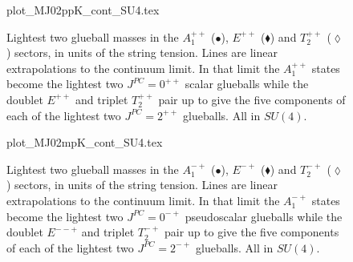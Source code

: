 \documentclass[12pt]{article}
\begin{document}




\begin{figure}[htb]
\begin	{center}
\leavevmode
	{plot_MJ02ppK_cont_SU4.tex}
\end	{center}
\caption{Lightest two glueball masses in the $A_1^{++}$ ($\bullet$), $E^{++}$ ($\blacklozenge$)
  and $T_2^{++}$ ($\lozenge$) sectors, in units of the string tension. Lines are linear
  extrapolations to the continuum limit. In that limit the  $A_1^{++}$ states become the
  lightest two $J^{PC}=0^{++}$ scalar glueballs while the doublet $E^{++}$ and triplet $T_2^{++}$
  pair up to give the five components of each of the lightest two $J^{PC}=2^{++}$ glueballs.
  All in $SU(4)$.}
\label{fig_MJ02ppK_cont_SU4}
\end{figure}



\begin{figure}[htb]
\begin	{center}
\leavevmode
	{plot_MJ02mpK_cont_SU4.tex}
\end	{center}
\caption{Lightest two glueball masses in the $A_1^{-+}$ ($\bullet$), $E^{-+}$ ($\blacklozenge$)
  and $T_2^{-+}$ ($\lozenge$) sectors, in units of the string tension. Lines are linear
  extrapolations to the continuum limit. In that limit the  $A_1^{-+}$ states become the
  lightest two $J^{PC}=0^{-+}$ pseudoscalar glueballs while the doublet $E^{--+}$ and triplet $T_2^{-+}$
  pair up to give the five components of each of the lightest two $J^{PC}=2^{-+}$ glueballs.
  All in $SU(4)$.}
\label{fig_MJ02mpK_cont_SU4}
\end{figure}
\end{document}
